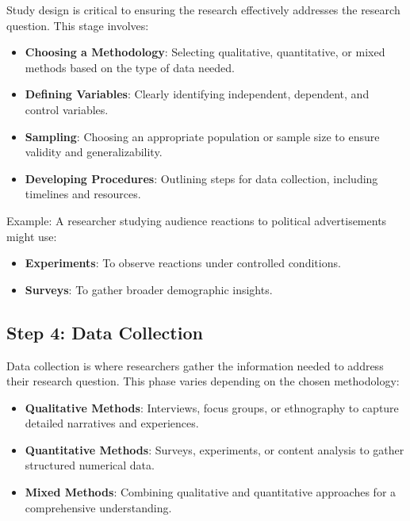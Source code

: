 \documentclass[
]{book}
\providecommand{\tightlist}{%
  \setlength{\itemsep}{0pt}\setlength{\parskip}{0pt}}
\begin{document}
Study design is critical to ensuring the research effectively addresses the research question. This stage involves:

\begin{itemize}
\tightlist
\item
  \textbf{Choosing a Methodology}: Selecting qualitative, quantitative, or mixed methods based on the type of data needed.
\item
  \textbf{Defining Variables}: Clearly identifying independent, dependent, and control variables.
\item
  \textbf{Sampling}: Choosing an appropriate population or sample size to ensure validity and generalizability.
\item
  \textbf{Developing Procedures}: Outlining steps for data collection, including timelines and resources.
\end{itemize}

Example: A researcher studying audience reactions to political advertisements might use:

\begin{itemize}
\tightlist
\item
  \textbf{Experiments}: To observe reactions under controlled conditions.
\item
  \textbf{Surveys}: To gather broader demographic insights.
\end{itemize}

\subsection*{Step 4: Data Collection}\label{step-4-data-collection}

Data collection is where researchers gather the information needed to address their research question. This phase varies depending on the chosen methodology:

\begin{itemize}
\tightlist
\item
  \textbf{Qualitative Methods}: Interviews, focus groups, or ethnography to capture detailed narratives and experiences.
\item
  \textbf{Quantitative Methods}: Surveys, experiments, or content analysis to gather structured numerical data.
\item
  \textbf{Mixed Methods}: Combining qualitative and quantitative approaches for a comprehensive understanding.
\end{itemize}
\end{document}
